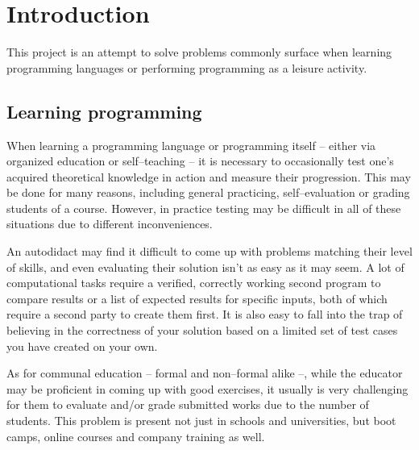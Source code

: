 


%
\onehalfspacing

\chapter{Introduction}\label{sect:Intro}

	This project is an attempt to solve problems commonly surface when learning programming languages or performing programming as a leisure activity.

	\section{Learning programming}
	
	When learning a programming language or programming itself -- either via organized education or self--teaching -- it is necessary to occasionally test one's acquired theoretical knowledge in action and measure their progression. This may be done for many reasons, including general practicing, self--evaluation or grading students of a course. However, in practice testing may be difficult in all of these situations due to different inconveniences.
	
	An autodidact may find it difficult to come up with problems matching their level of skills, and even evaluating their solution isn't as easy as it may seem. A lot of computational tasks require a verified, correctly working second program to compare results or a list of expected results for specific inputs, both of which require a second party to create them first. It is also easy to fall into the trap of believing in the correctness of your solution based on a limited set of test cases you have created on your own.
	
	As for communal education -- formal and non--formal alike --, while the educator may be proficient in coming up with good exercises, it usually is very challenging for them to evaluate and/or grade submitted works due to the number of students. This problem is present not just in schools and universities, but boot camps, online courses and company training as well.
	
